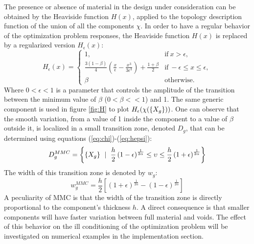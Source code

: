 The presence or absence of material in the design under consideration can be obtained by the Heaviside function $H(x)$, applied to the topology description function of the union of all the components $\chi$. In order to have a regular behavior of the optimization problem responses, the Heaviside function $H(x)$ is replaced by a regularized version $H_{\epsilon}(x)$:
\begin{equation}
\label{eq:hepsi}
    H_{\epsilon}(x)=\begin{cases}
    1, & \text{if}\  x > \epsilon,\\
    \frac{3(1-\beta)}{4}\left(\frac{x}{\epsilon}-\frac{x^3}{3\epsilon^3}\right)+\frac{1+\beta}{2} & \text{if}\  -\epsilon\leq x\leq \epsilon,\\
    \beta & \text{otherwise}.
    \end{cases}
\end{equation}
Where $0<\epsilon<1$ is a parameter that controls the amplitude of the transition between the minimum value of $\beta$  ($0<\beta<<1$) and 1. The same generic component is used in figure \ref{fig:H} to plot $H_{\epsilon}(\chi(\left\{{X_g}\right\}))$. One can observe that the smooth variation, from a value of 1 inside the component to a value of $\beta$  outside it, is localized in a small transition zone, denoted $D_g$, that can be determined using equations (\ref{eq:chi})-(\ref{eq:hepsi}):
\begin{equation}
D_g^{MMC}=\left\lbrace \left\{{X_g}\right\}\ \mid \  \frac{h}{2}\left(1-\epsilon\right)^{\frac{1}{2\alpha}}\leq \upsilon \leq  \frac{h}{2}\left(1+\epsilon\right)^{\frac{1}{2\alpha}}\right\rbrace    
\end{equation}
The width of this transition zone is denoted by $w_g$:
\begin{equation}
    w_g^{MMC}=\frac{h}{2}\left[\left(1+\epsilon\right)^{\frac{1}{2\alpha}}-\left(1-\epsilon\right)^{\frac{1}{2\alpha}}\right]
\end{equation}
A peculiarity of MMC is that the width of the transition zone is directly proportional to the component's thickness $h$. A direct consequence is that smaller components will have faster variation between full material and voids. The effect of this behavior on the ill conditioning of the optimization problem will be investigated on numerical examples in the implementation section.

